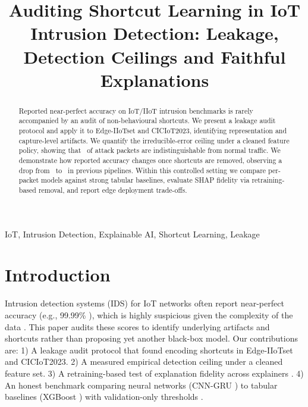 \documentclass[conference]{IEEEtran}
\begin{document}
\title{Auditing Shortcut Learning in IoT Intrusion Detection: Leakage, Detection Ceilings and Faithful Explanations}

\author{
}

\maketitle

\begin{abstract}
Reported near-perfect accuracy on IoT/IIoT intrusion benchmarks is rarely accompanied by an audit of non-behavioural shortcuts. We present a leakage audit protocol and apply it to Edge-IIoTset and CICIoT2023, identifying representation and capture-level artifacts. We quantify the irreducible-error ceiling under a cleaned feature policy, showing that \HiddenPct\ of attack packets are indistinguishable from normal traffic. We demonstrate how reported accuracy changes once shortcuts are removed, observing a drop from \FerragRepAcc\ to \FerragCleanAcc\ in previous pipelines. Within this controlled setting we compare per-packet models against strong tabular baselines, evaluate SHAP fidelity via retraining-based removal, and report edge deployment trade-offs.
\end{abstract}

\begin{IEEEkeywords}
IoT, Intrusion Detection, Explainable AI, Shortcut Learning, Leakage
\end{IEEEkeywords}

\section{Introduction}
Intrusion detection systems (IDS) for IoT networks often report near-perfect accuracy (e.g., 99.99\% \cite{ferrag2022edge}), which is highly suspicious given the complexity of the data \cite{arp2022dos, kapoor2023leakage, geirhos2020shortcut}. This paper audits these scores to identify underlying artifacts and shortcuts rather than proposing yet another black-box model. Our contributions are:
1) A leakage audit protocol that found encoding shortcuts in Edge-IIoTset and CICIoT2023.
2) A measured empirical detection ceiling under a cleaned feature set.
3) A retraining-based test of explanation fidelity across explainers \cite{lundberg2017unified, ribeiro2016why}.
4) An honest benchmark comparing neural networks (CNN-GRU \cite{cho2014learning}) to tabular baselines (XGBoost \cite{chen2016xgboost}) with validation-only thresholds \cite{akiba2019optuna}.
\end{document}
